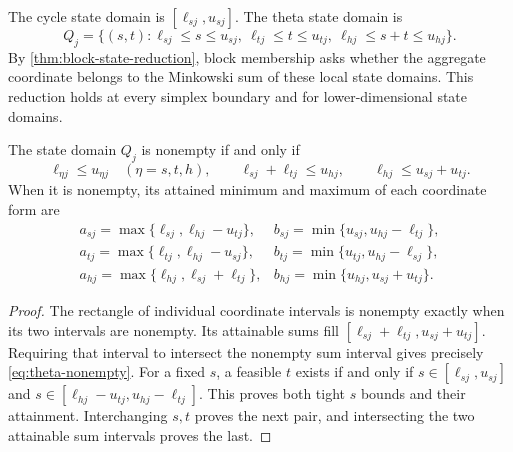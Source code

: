 The cycle state domain is $[\ell_{sj},u_{sj}]$. The theta state domain is
\begin{equation}\label{eq:theta-state}
 Q_j=\{(s,t):\ell_{sj}\le s\le u_{sj},\
       \ell_{tj}\le t\le u_{tj},\
       \ell_{hj}\le s+t\le u_{hj}\}.
\end{equation}
By \cref{thm:block-state-reduction}, block membership asks whether the
aggregate coordinate belongs to the Minkowski sum of these local state
domains. This reduction holds at every simplex boundary and for
lower-dimensional state domains.

\begin{lemma}\label{lem:theta-supports}
The state domain $Q_j$ is nonempty if and only if
\begin{equation}\label{eq:theta-nonempty}
 \ell_{\eta j}\le u_{\eta j}\quad(\eta=s,t,h),\qquad
 \ell_{sj}+\ell_{tj}\le u_{hj},\qquad
 \ell_{hj}\le u_{sj}+u_{tj}.
\end{equation}
When it is nonempty, its attained minimum and maximum of each coordinate
form are
\begin{equation}\label{eq:theta-six-supports}
\begin{array}{ll}
 a_{sj}=\max\{\ell_{sj},\ell_{hj}-u_{tj}\},&
 b_{sj}=\min\{u_{sj},u_{hj}-\ell_{tj}\},\\[2pt]
 a_{tj}=\max\{\ell_{tj},\ell_{hj}-u_{sj}\},&
 b_{tj}=\min\{u_{tj},u_{hj}-\ell_{sj}\},\\[2pt]
 a_{hj}=\max\{\ell_{hj},\ell_{sj}+\ell_{tj}\},&
 b_{hj}=\min\{u_{hj},u_{sj}+u_{tj}\}.
\end{array}
\end{equation}
\end{lemma}
\begin{proof}
The rectangle of individual coordinate intervals is nonempty exactly
when its two intervals are nonempty. Its attainable sums fill
$[\ell_{sj}+\ell_{tj},u_{sj}+u_{tj}]$. Requiring that interval to
intersect the nonempty sum interval gives precisely
\eqref{eq:theta-nonempty}. For a fixed $s$, a feasible $t$ exists if and
only if $s\in[\ell_{sj},u_{sj}]$ and
$s\in[\ell_{hj}-u_{tj},u_{hj}-\ell_{tj}]$. This proves both tight
$s$ bounds and their attainment. Interchanging $s,t$ proves the next
pair, and intersecting the two attainable sum intervals proves the last.
\end{proof}

